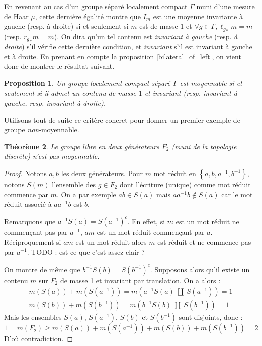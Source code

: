 \documentclass[a4paper,12pt]{article}
\newtheorem{theorem}{Théorème}[section]
\newtheorem{proposition}[theorem]{Proposition}
\newcommand{\set}[1]{\left\{ #1 \right\}}
\newcommand{\ssi}{si et seulement si }
\newcommand{\inv}{^{-1}}
\newcommand{\compl}{^c}
\newcommand{\TODO}[1]{{\color{red}TODO :} #1}
\begin{document}
En revenant au cas d'un groupe séparé localement compact $\Gamma$ muni d'une mesure de Haar $\mu$, 
cette dernière égalité montre que $I_m$ est une moyenne invariante à gauche (resp. à droite) \ssi 
$m$ est de masse $1$ et $\forall g\in\Gamma, {\ell_g}_*m = m$ (resp. ${r_g}_*m = m$). On dira qu'un tel 
contenu est \emph{invariant à gauche} (resp. \emph{à droite}) s'il vérifie cette dernière condition, et 
\emph{invariant} s'il est invariant à gauche et à droite. En prenant en compte la proposition \ref{bilateral_of_left},
on vient donc de montrer le résultat suivant.
\begin{proposition}
    Un groupe localement compact séparé $\Gamma$ est moyennable \ssi il admet un contenu de masse $1$ et invariant 
    (resp. invariant à gauche, resp. invariant à droite).
\end{proposition}

Utilisons tout de suite ce critère concret pour donner un premier exemple de groupe \emph{non}-moyennable.

\begin{theorem}\label{not_amenable_F2}
    Le groupe libre en deux générateurs $F_2$ (muni de la topologie discrète) n'est pas moyennable.
\end{theorem}

\begin{proof}
    Notons $a, b$ les deux générateurs. Pour $m$ mot réduit en $\set{a, b, a\inv, b\inv}$, notons 
    $S(m)$ l'ensemble des $g\in F_2$ dont l'écriture (unique) comme mot réduit
    commence par $m$. On a par exemple $ab\in S(a)$ mais $a a\inv b \notin S(a)$ car le mot réduit associé 
    à $a a\inv b$ est $b$.

    Remarquons que $a\inv S(a) = S(a\inv)\compl$. En effet, si $m$ est un mot réduit ne commençant pas par $a\inv$, 
    $am$ est un mot réduit commençant par $a$. Réciproquement si $am$ est un mot réduit alors $m$ est réduit et ne commence 
    pas par $a\inv$. \TODO{est-ce que c'est assez clair ?}

    On montre de même que $b\inv S(b) = S(b\inv)\compl$. Supposons alors qu'il existe un contenu $m$ sur 
    $F_2$ de masse 1 et invariant par translation. On a alors :
    \begin{gather*}
        m(S(a)) + m(S(a\inv)) = m(a\inv S(a)\ \amalg\ S(a\inv)) = 1 \\
        m(S(b)) + m(S(b\inv)) = m(b\inv S(b)\ \amalg\ S(b\inv)) = 1
    \end{gather*}
    Mais les ensembles $S(a)$, $S(a\inv)$, $S(b)$ et $S(b\inv)$ sont disjoints, donc :
    \begin{equation*}
        1 = m(F_2) \ge m(S(a)) + m(S(a\inv)) + m(S(b)) + m(S(b\inv)) = 2
    \end{equation*} 
    D'où contradiction.
\end{proof}
\end{document}
